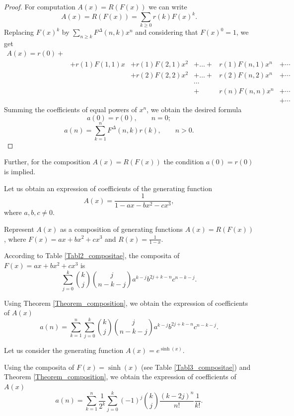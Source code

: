 \documentclass[12pt]{article}
\begin{document}
\begin{proof}
For computation $A(x)=R(F(x))$ we can write   
$$
A(x)=R(F(x))=\sum_{k\geq 0} r(k)F(x)^k.
$$
Replacing $F(x)^k$ by $\sum_{n\geq k}F^{\Delta}(n,k)x^n$ and considering that $F(x)^0=1$, we get 
$$
\begin{array}{llllll}
A(x)=r(0)+\\
&+r(1)F(1,1)x&+r(1)F(2,1)x^2&+\ldots+&r(1)F(n,1)x^n&+\cdots\\
 &          & +r(2)F(2,2)x^2&+\ldots+&r(2)F(n,2)x^n&+\cdots\\
  &         & & \cdots & \\
   &        & &+        & r(n)F(n,n)x^n&+\cdots\\
    &       & &  & &+\cdots
\end{array}
$$
Summing the coefficients of equal powers of $x^n$, we obtain the desired formula
$$
a(0)=r(0),\qquad n=0;
$$
$$
a(n)=\sum_{k=1}^nF^{\Delta}(n,k)r(k), \qquad n>0.
$$
\end{proof}

Further, for the composition $A(x)=R(F(x))$ the condition $a(0)=r(0)$ is implied.

\begin{example}
Let us obtain an expression of coefficients of the generating function 
$$A(x)=\frac{1}{1-ax-bx^2-cx^3},$$
 where $a,b,c\neq 0$.
 
Represent $A(x)$ as a composition of generating functions $A(x)=R(F(x))$,
where $F(x)=ax+bx^2+cx^3$ and $R(x)=\frac{1}{1-x}$.

According to Table \ref{Tabl2_compositae}, the composita of $F(x)=ax+bx^2+cx^3$ is
$$
\sum\limits_{j=0}^k{k\choose j}{j \choose n-k-j}a^{k-j}b^{2j+k-n}c^{n-k-j}.
$$

Using Theorem \ref{Theorem_composition}, we obtain the expression  of coefficients of $A(x)$ 
$$
a(n)=\sum_{k=1}^n \sum\limits_{j=0}^k{k\choose j}{j \choose n-k-j}a^{k-j}b^{2j+k-n}c^{n-k-j}.
$$
\end{example}

\begin{example}
Let us consider the generating function $A(x)=e^{\sinh(x)}$. 

Using  the composita of $F(x)=\sinh(x)$ (see Table \ref{Tabl3_compositae}) and Theorem \ref{Theorem_composition}, we obtain the expression  of coefficients of $A(x)$ 
$$
a(n)=\sum\limits_{k=1}^n\frac{1}{2^k}\sum\limits_{j=0}^k (-1)^j{k\choose j} \frac{(k-2j)^n}{n!}\frac{1}{k!}.
$$
\end{example}
\end{document}
